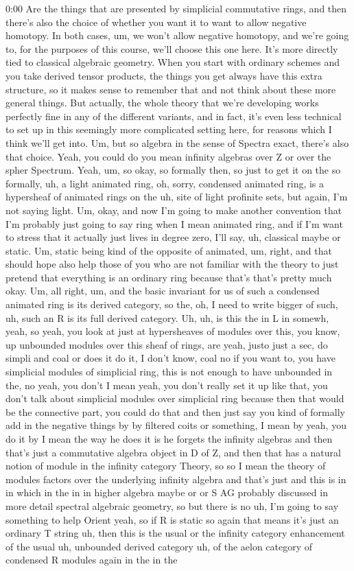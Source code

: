 \begin{unfinished}{0:00}
Are the things that are presented by simplicial commutative rings, and then there's also the choice of whether you want it to want to allow negative homotopy. In both cases, um, we won't allow negative homotopy, and we're going to, for the purposes of this course, we'll choose this one here. It's more directly tied to classical algebraic geometry. When you start with ordinary schemes and you take derived tensor products, the things you get always have this extra structure, so it makes sense to remember that and not think about these more general things. But actually, the whole theory that we're developing works perfectly fine in any of the different variants, and in fact, it's even less technical to set up in this seemingly more complicated setting here, for reasons which I think we'll get into. Um, but so algebra in the sense of Spectra exact, there's also that choice. Yeah, you could do you mean infinity algebras over Z or over the spher Spectrum. Yeah, um, so okay, so formally then, so just to get it on the so formally, uh, a light animated ring, oh, sorry, condensed animated ring, is a hypersheaf of animated rings on the uh, site of light profinite sets, but again, I'm not saying light. Um, okay, and now I'm going to make another convention that I'm probably just going to say ring when I mean animated ring, and if I'm want to stress that it actually just lives in degree zero, I'll say, uh, classical maybe or static. Um, static being kind of the opposite of animated, um, right, and that should hope also help those of you who are not familiar with the theory to just pretend that everything is an ordinary ring because that's that's pretty much okay. Um, all right, um, and the basic invariant for us of such a condensed animated ring is its derived category, so the, oh, I need to write bigger of such, uh, such an R is its full derived category. Uh, uh, is this the in L in somewh, yeah, so yeah, you look at just at hypersheaves of modules over this, you know, up unbounded modules over this sheaf of rings, are yeah, justo just a sec, do simpli and coal or does it do it, I don't know, coal no if you want to, you have simplicial modules of simplicial ring, this is not enough to have unbounded in the, no yeah, you don't I mean yeah, you don't really set it up like that, you don't talk about simplicial modules over simplicial ring because then that would be the connective part, you could do that and then just say you kind of formally add in the negative things by by filtered coits or something, I mean by yeah, you do it by I mean the way he does it is he forgets the infinity algebras and then that's just a commutative algebra object in D of Z, and then that has a natural notion of module in the infinity category Theory, so so I mean the theory of modules factors over the underlying infinity algebra and that's just and this is in in which in the in in higher algebra maybe or or S AG probably discussed in more detail spectral algebraic geometry, so but there is no uh, I'm going to say something to help Orient yeah, so if R is static so again that means it's just an ordinary T string uh, then this is the usual or the infinity category enhancement of the usual uh, unbounded derived category uh, of the aelon category of condensed R modules again in the in the 
\end{unfinished}
